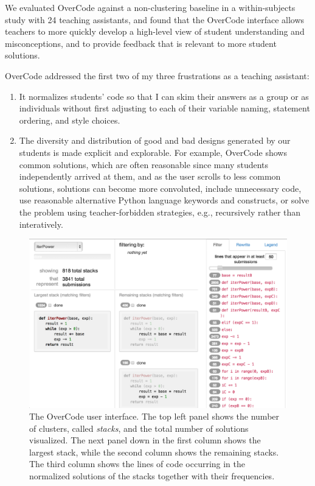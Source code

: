 We evaluated OverCode against a non-clustering baseline in a within-subjects study with 24 teaching assistants, and found that the OverCode interface allows teachers to more quickly develop a high-level view of student understanding and misconceptions, and to provide feedback that is relevant to more student solutions.

OverCode addressed the first two of my three frustrations as a teaching assistant:
\begin{enumerate}
\item It normalizes students' code so that I can skim their answers as a group or as individuals without first adjusting to each of their variable naming, statement ordering, and style choices.
\item The diversity and distribution of good and bad designs generated by our students is made explicit and explorable. For example, OverCode shows common solutions, which are often reasonable since many students independently arrived at them, and as the user scrolls to less common solutions, solutions can become more convoluted, include unnecessary code, use reasonable alternative Python language keywords and constructs, or solve the problem using teacher-forbidden strategies, e.g., recursively rather than interatively.
\end{enumerate}

\begin{figure}
\centering
\includegraphics[width=1.0\linewidth]{Body/figures/interfaceScreenShot.png}
\caption{The OverCode user interface. The top left panel shows the number of clusters, called {\it stacks}, and the total number of solutions visualized. The next panel down in the first column shows the largest stack, while the second column shows the remaining stacks. The third column shows the lines of code occurring in the normalized solutions of the stacks together with their frequencies.}
\label{fullinterface}
\end{figure}


